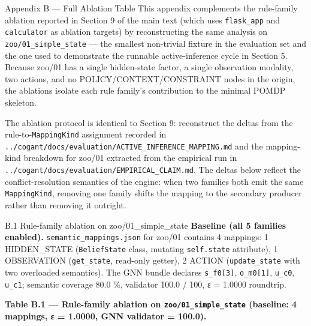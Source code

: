 \documentclass[
  ignorenonframetext,
]{beamer}
\author{\texorpdfstring{}{}}
\date{}
\begin{document}
\begin{frame}[fragile]{Appendix B --- Full Ablation Table}
\protect{}\label{appendix-b-full-ablation-table}
This appendix complements the rule-family ablation reported in Section 9
of the main text (which uses \texttt{flask\_app} and \texttt{calculator}
as ablation targets) by reconstructing the same analysis on
\texttt{zoo/01\_simple\_state} --- the smallest non-trivial fixture in
the evaluation set and the one used to demonstrate the runnable
active-inference cycle in Section 5. Because zoo/01 has a single
hidden-state factor, a single observation modality, two actions, and no
POLICY/CONTEXT/CONSTRAINT nodes in the origin, the ablations isolate
each rule family's contribution to the minimal POMDP skeleton.

The ablation protocol is identical to Section 9: reconstruct the deltas
from the rule-to-\texttt{MappingKind} assignment recorded in
\texttt{../cogant/docs/evaluation/ACTIVE\_INFERENCE\_MAPPING.md} and the
mapping-kind breakdown for zoo/01 extracted from the empirical run in
\texttt{../cogant/docs/evaluation/EMPIRICAL\_CLAIM.md}. The deltas below
reflect the conflict-resolution semantics of the engine: when two
families both emit the same \texttt{MappingKind}, removing one family
shifts the mapping to the secondary producer rather than removing it
outright.

\begin{block}{B.1 Rule-family ablation on zoo/01\_simple\_state}
\protect{}\label{b.1-rule-family-ablation-on-zoo01_simple_state}
\textbf{Baseline (all 5 families enabled).}
\texttt{semantic\_mappings.json} for zoo/01 contains 4 mappings: 1
HIDDEN\_STATE (\texttt{BeliefState} class, mutating \texttt{self.state}
attribute), 1 OBSERVATION (\texttt{get\_state}, read-only getter), 2
ACTION (\texttt{update\_state} with two overloaded semantics). The GNN
bundle declares \texttt{s\_f0{[}3{]}}, \texttt{o\_m0{[}1{]}},
\texttt{u\_c0}, \texttt{u\_c1}; semantic coverage 80.0 \%, validator
100.0 / 100, ε = 1.0000 roundtrip.

\textbf{Table B.1 --- Rule-family ablation on
\texttt{zoo/01\_simple\_state} (baseline: 4 mappings, ε = 1.0000, GNN
validator = 100.0).}


\end{block}
\end{frame}
\end{document}
